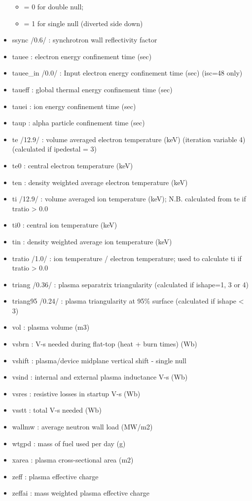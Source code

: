 \documentclass[]{article}
\providecommand{\tightlist}{%
  \setlength{\itemsep}{0pt}\setlength{\parskip}{0pt}}
\begin{document}
\begin{itemize}
  \begin{itemize}
  \tightlist
  \item
    = 0 for double null;
  \item
    = 1 for single null (diverted side down)
  \end{itemize}
\item
  ssync /0.6/ : synchrotron wall reflectivity factor
\item
  tauee : electron energy confinement time (sec)
\item
  tauee\_in /0.0/ : Input electron energy confinement time (sec) (isc=48
  only)
\item
  taueff : global thermal energy confinement time (sec)
\item
  tauei : ion energy confinement time (sec)
\item
  taup : alpha particle confinement time (sec)
\item
  te /12.9/ : volume averaged electron temperature (keV) (iteration
  variable 4) (calculated if ipedestal = 3)
\item
  te0 : central electron temperature (keV)
\item
  ten : density weighted average electron temperature (keV)
\item
  ti /12.9/ : volume averaged ion temperature (keV); N.B. calculated
  from te if tratio \textgreater{} 0.0
\item
  ti0 : central ion temperature (keV)
\item
  tin : density weighted average ion temperature (keV)
\item
  tratio /1.0/ : ion temperature / electron temperature; used to
  calculate ti if tratio \textgreater{} 0.0
\item
  triang /0.36/ : plasma separatrix triangularity (calculated if
  ishape=1, 3 or 4)
\item
  triang95 /0.24/ : plasma triangularity at 95\% surface (calculated if
  ishape \textless{} 3)
\item
  vol : plasma volume (m3)
\item
  vsbrn : V-s needed during flat-top (heat + burn times) (Wb)
\item
  vshift : plasma/device midplane vertical shift - single null
\item
  vsind : internal and external plasma inductance V-s (Wb)
\item
  vsres : resistive losses in startup V-s (Wb)
\item
  vsstt : total V-s needed (Wb)
\item
  wallmw : average neutron wall load (MW/m2)
\item
  wtgpd : mass of fuel used per day (g)
\item
  xarea : plasma cross-sectional area (m2)
\item
  zeff : plasma effective charge
\item
  zeffai : mass weighted plasma effective charge
\end{itemize}
\end{document}

